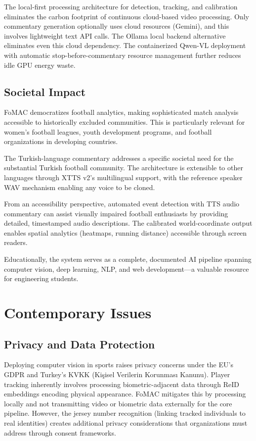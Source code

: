 \documentclass[10pt,twocolumn,a4paper]{article}
\begin{document}
The local-first processing architecture for detection, tracking, and calibration eliminates the carbon footprint of continuous cloud-based video processing. Only commentary generation optionally uses cloud resources (Gemini), and this involves lightweight text API calls. The Ollama local backend alternative eliminates even this cloud dependency. The containerized Qwen-VL deployment with automatic stop-before-commentary resource management further reduces idle GPU energy waste.

\subsection{Societal Impact}

FoMAC democratizes football analytics, making sophisticated match analysis accessible to historically excluded communities. This is particularly relevant for women's football leagues, youth development programs, and football organizations in developing countries.

The Turkish-language commentary addresses a specific societal need for the substantial Turkish football community. The architecture is extensible to other languages through XTTS v2's multilingual support, with the reference speaker WAV mechanism enabling any voice to be cloned.

From an accessibility perspective, automated event detection with TTS audio commentary can assist visually impaired football enthusiasts by providing detailed, timestamped audio descriptions. The calibrated world-coordinate output enables spatial analytics (heatmaps, running distance) accessible through screen readers.

Educationally, the system serves as a complete, documented AI pipeline spanning computer vision, deep learning, NLP, and web development---a valuable resource for engineering students.

\section{Contemporary Issues}

\subsection{Privacy and Data Protection}

Deploying computer vision in sports raises privacy concerns under the EU's GDPR and Turkey's KVKK (Ki\c{s}isel Verilerin Korunmas{\i} Kanunu). Player tracking inherently involves processing biometric-adjacent data through ReID embeddings encoding physical appearance. FoMAC mitigates this by processing locally and not transmitting video or biometric data externally for the core pipeline. However, the jersey number recognition (linking tracked individuals to real identities) creates additional privacy considerations that organizations must address through consent frameworks.
\end{document}
